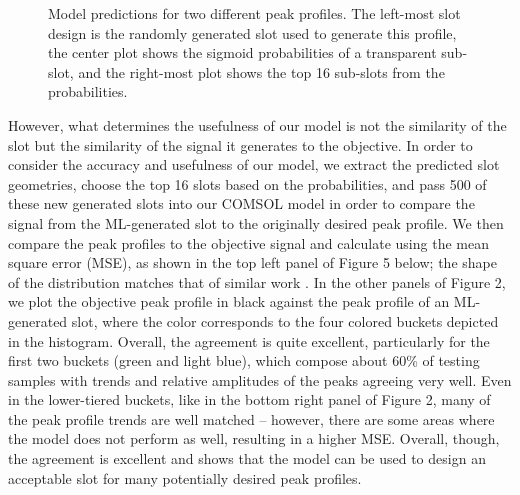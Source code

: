 \documentclass[11pt]{article}
\begin{document}
\begin{figure}[H]
	\centering
	\caption{Model predictions for two different peak profiles. The left-most slot design is the randomly generated slot used to generate this profile, the center plot shows the sigmoid probabilities of a transparent sub-slot, and the right-most plot shows the top 16 sub-slots from the probabilities.}
\end{figure}

\noindent However, what determines the usefulness of our model is not the similarity of the slot but the similarity of the signal it generates to the objective. In order to consider the accuracy and usefulness of our model, we extract the predicted slot geometries, choose the top 16 slots based on the probabilities, and pass 500 of these new generated slots into our COMSOL model in order to compare the signal from the ML-generated slot to the originally desired peak profile. We then compare the peak profiles to the objective signal and calculate using the mean square error (MSE), as shown in the top left panel of Figure 5 below; the shape of the distribution matches that of similar work \cite{Nadell:19}. In the other panels of Figure 2, we plot the objective peak profile in black against the peak profile of an ML-generated slot, where the color corresponds to the four colored buckets depicted in the histogram. Overall, the agreement is quite excellent, particularly for the first two buckets (green and light blue), which compose about 60\% of testing samples with trends and relative amplitudes of the peaks agreeing very well. Even in the lower-tiered buckets, like in the bottom right panel of Figure 2, many of the peak profile trends are well matched -- however, there are some areas where the model does not perform as well, resulting in a higher MSE. Overall, though, the agreement is excellent and shows that the model can be used to design an acceptable slot for many potentially desired peak profiles. 
\end{document}
